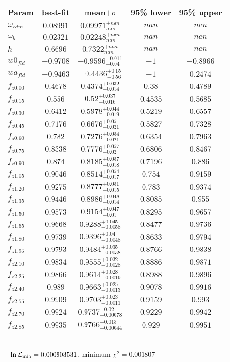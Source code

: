 \begin{tabular}{|l|c|c|c|c|} 
 \hline 
Param & best-fit & mean$\pm\sigma$ & 95\% lower & 95\% upper \\ \hline 
$\omega_{cdm }$ &$0.08991$ & $0.09971_{nan}^{+nan}$ & $nan$ & $nan$ \\ 
$\omega_{b }$ &$0.02321$ & $0.02248_{nan}^{+nan}$ & $nan$ & $nan$ \\ 
$h$ &$0.6696$ & $0.7322_{nan}^{+nan}$ & $nan$ & $nan$ \\ 
$w0_{fld }$ &$-0.9708$ & $-0.9596_{-0.04}^{+0.011}$ & $-1$ & $-0.8966$ \\ 
$wa_{fld }$ &$-0.9463$ & $-0.4436_{-0.56}^{+0.15}$ & $-1$ & $0.2474$ \\ 
$f_{z0.00 }$ &$0.4678$ & $0.4374_{-0.014}^{+0.032}$ & $0.38$ & $0.4789$ \\ 
$f_{z0.15 }$ &$0.556$ & $0.52_{-0.016}^{+0.037}$ & $0.4535$ & $0.5685$ \\ 
$f_{z0.30 }$ &$0.6412$ & $0.5978_{-0.019}^{+0.044}$ & $0.5219$ & $0.6557$ \\ 
$f_{z0.45 }$ &$0.7176$ & $0.6676_{-0.021}^{+0.05}$ & $0.5827$ & $0.7328$ \\ 
$f_{z0.60 }$ &$0.782$ & $0.7276_{-0.021}^{+0.054}$ & $0.6354$ & $0.7963$ \\ 
$f_{z0.75 }$ &$0.8338$ & $0.7776_{-0.02}^{+0.057}$ & $0.6806$ & $0.8467$ \\ 
$f_{z0.90 }$ &$0.874$ & $0.8185_{-0.018}^{+0.057}$ & $0.7196$ & $0.886$ \\ 
$f_{z1.05 }$ &$0.9046$ & $0.8514_{-0.017}^{+0.054}$ & $0.754$ & $0.9159$ \\ 
$f_{z1.20 }$ &$0.9275$ & $0.8777_{-0.015}^{+0.051}$ & $0.783$ & $0.9374$ \\ 
$f_{z1.35 }$ &$0.9446$ & $0.8986_{-0.014}^{+0.048}$ & $0.8085$ & $0.955$ \\ 
$f_{z1.50 }$ &$0.9573$ & $0.9154_{-0.01}^{+0.047}$ & $0.8295$ & $0.9657$ \\ 
$f_{z1.65 }$ &$0.9668$ & $0.9288_{-0.0058}^{+0.045}$ & $0.8477$ & $0.9736$ \\ 
$f_{z1.80 }$ &$0.9739$ & $0.9396_{-0.0048}^{+0.04}$ & $0.8633$ & $0.9794$ \\ 
$f_{z1.95 }$ &$0.9793$ & $0.9484_{-0.0038}^{+0.035}$ & $0.8766$ & $0.9838$ \\ 
$f_{z2.10 }$ &$0.9834$ & $0.9555_{-0.0028}^{+0.032}$ & $0.8886$ & $0.9871$ \\ 
$f_{z2.25 }$ &$0.9866$ & $0.9614_{-0.0019}^{+0.028}$ & $0.8988$ & $0.9896$ \\ 
$f_{z2.40 }$ &$0.989$ & $0.9663_{-0.0013}^{+0.025}$ & $0.9078$ & $0.9916$ \\ 
$f_{z2.55 }$ &$0.9909$ & $0.9703_{-0.0011}^{+0.023}$ & $0.9159$ & $0.993$ \\ 
$f_{z2.70 }$ &$0.9924$ & $0.9737_{-0.00078}^{+0.02}$ & $0.9229$ & $0.9942$ \\ 
$f_{z2.85 }$ &$0.9935$ & $0.9766_{-0.00044}^{+0.018}$ & $0.929$ & $0.9951$ \\ 
\hline 
 \end{tabular} \\ 
$-\ln{\cal L}_\mathrm{min} =0.000903531$, minimum $\chi^2=0.001807$ \\ 
